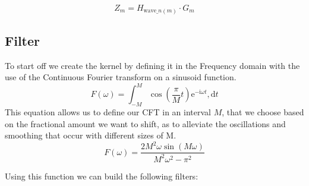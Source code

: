 \documentclass[]{usiinfbachelorproject}
\begin{document}
	\begin{equation}\label{phase_shift_equation}
		Z_m = H_{\text{wave}\_n(m)} \cdot G_m
	\end{equation}	
	
	
	
	\subsection{Filter}
	To start off we create the kernel by defining it in the Frequency domain with the use of the Continuous Fourier transform on a sinusoid function.
	\begin{equation}
		F(\omega) = \int_{-M}^{M} \cos(\frac{\pi}{M}t)\mathrm{e}^{-\mathrm{i}\omega t},\mathrm{d}t
	\end{equation}
	This equation allows us to define our CFT in an interval $M$, that we choose based on the fractional amount we want to shift, as to alleviate the oscillations and smoothing that occur with different sizes of M.
	\begin{equation}\label{filter_formula}
		F(\omega) = \frac{2M^2\omega \sin(M\omega)}{M^2\omega^2-\pi^2}
	\end{equation}
	
	Using this function we can build the following filters:
	
\end{document}
